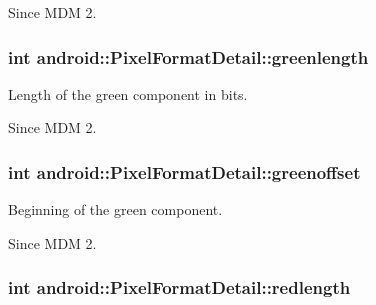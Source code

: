 \begin{DoxySince}{\-Since}
\-M\-D\-M 2. 
\end{DoxySince}
\hypertarget{structandroid_1_1PixelFormatDetail_ad36562dae6d3fc77c3b59e97965a2dcd}{
\subsubsection[{greenlength}]{\setlength{\rightskip}{0pt plus 5cm}int {\bf android\-::\-Pixel\-Format\-Detail\-::greenlength}}}\label{structandroid_1_1PixelFormatDetail_ad36562dae6d3fc77c3b59e97965a2dcd}


\-Length of the green component in bits. 

\begin{DoxySince}{\-Since}
\-M\-D\-M 2. 
\end{DoxySince}
\hypertarget{structandroid_1_1PixelFormatDetail_a298cf325578203cdae53f5339e43e846}{
\subsubsection[{greenoffset}]{\setlength{\rightskip}{0pt plus 5cm}int {\bf android\-::\-Pixel\-Format\-Detail\-::greenoffset}}}\label{structandroid_1_1PixelFormatDetail_a298cf325578203cdae53f5339e43e846}


\-Beginning of the green component. 

\begin{DoxySince}{\-Since}
\-M\-D\-M 2. 
\end{DoxySince}
\hypertarget{structandroid_1_1PixelFormatDetail_ae6ec136dfd320bfee96a33c2fb1b1be1}{
\subsubsection[{redlength}]{\setlength{\rightskip}{0pt plus 5cm}int {\bf android\-::\-Pixel\-Format\-Detail\-::redlength}}}\label{structandroid_1_1PixelFormatDetail_ae6ec136dfd320bfee96a33c2fb1b1be1}


